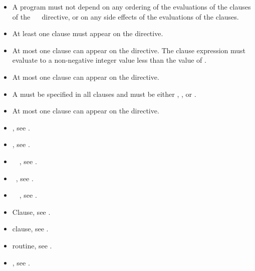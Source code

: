 \restrictions
\begin{itemize}
\item A program must not depend on any ordering of the evaluations of the clauses 
      of the ~~ directive, or on any side effects 
      of the evaluations of the clauses.
\item At least one  clause must appear on the directive.
\item At most one  clause can appear on the directive. The 
       clause expression must evaluate to a non-negative integer 
      value less than the value of .
\item At most one  clause can appear on the directive.
\item A  must be specified in all  clauses and must be 
      either , , or .
\item At most one  clause can appear on the directive.
\end{itemize}

\crossreferences
\begin{itemize}
\item {}, see .

\item {}, see .

\item {}~~,
see .

\item {}~, see .

\item {}~~,
see .

\item {} Clause, see .

\item {} clause, see .

\item {} routine, see .

\item {}, see
.

\end{itemize}



